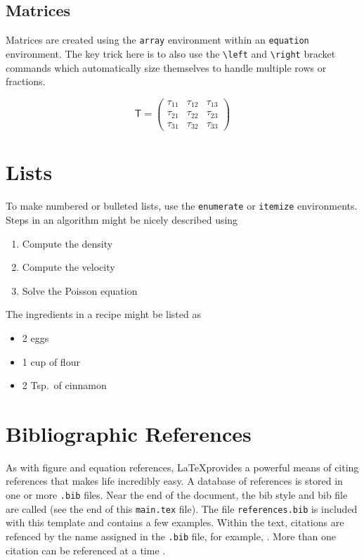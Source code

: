 \documentclass[12pt,letterpaper]{article}
\begin{document}
\subsection{Matrices}
Matrices are created using the \verb/array/ environment within an \verb/equation/ environment.  The key trick here is to also use the \verb/\left/ and \verb/\right/ bracket commands which automatically size themselves to handle multiple rows or fractions.

\begin{equation}
\label{eq:matrix}
\mathsf{T} = \left( \begin{array}{ccc} \tau_{11} & \tau_{12} & \tau_{13} \\
                                       \tau_{21} & \tau_{22} & \tau_{23} \\
                                       \tau_{31} & \tau_{32} & \tau_{33} \end{array} \right)
\end{equation}

\section{Lists}
\label{sec:lists}

To make numbered or bulleted lists, use the \verb/enumerate/ or \verb/itemize/ environments.  Steps in an algorithm might be nicely described using
\begin{enumerate}
\item Compute the density
\item Compute the velocity
\item Solve the Poisson equation
\end{enumerate}
The ingredients in a recipe might be listed as
\begin{itemize}
\item 2 eggs
\item 1 cup of flour
\item 2 Tsp.~of cinnamon
\end{itemize}

\section{Bibliographic References}
\label{sec:bib_ref}

As with figure and equation references, \LaTeX provides a powerful means of citing references that makes life incredibly easy.  A database of references is stored in one or more \verb/.bib/ files.  Near the end of the document, the bib style and bib file are called (see the end of this \verb/main.tex/ file). The file \verb/references.bib/ is included with this template and contains a few examples.  Within the text, citations are refenced by the name assigned in the \verb/.bib/ file, for example, \cite{FDS_Math_Guide}.  More than one citation can be referenced at a time \cite{Beyler:hood,FDS_Math_Guide}.
\end{document}
